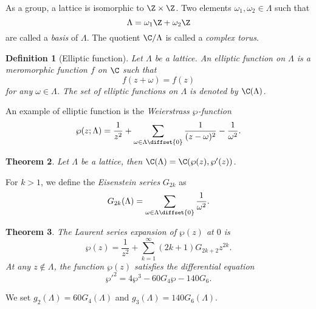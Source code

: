 \documentclass{article}
\newtheorem{theorem}{Theorem}
\newtheorem{definition}[theorem]{Definition}
\begin{document}
As a group, a lattice is isomorphic to $\Z\times\Z$. Two elements
$\omega_1,\omega_2\in\Lambda$ such that
\begin{equation}
  \label{eq:135}
  \Lambda = \omega_1\Z + \omega_2\Z
\end{equation}
are called a \emph{basis} of $\Lambda$. The quotient $\C/\Lambda$ is
called a \emph{complex torus}.

\begin{definition}[Elliptic function]
  Let $\Lambda$ be a lattice. An \emph{elliptic function} on $\Lambda$
  is a meromorphic function $f$ on $\C$ such that
  \begin{equation}
    \label{eq:141}
    f(z+\omega) = f(z)
  \end{equation}
  for any $\omega\in\Lambda$.  The set of elliptic functions on
  $\Lambda$ is denoted by $\C(\Lambda)$.
\end{definition}

An example of elliptic function is the \emph{Weierstrass
  $\wp$-function}
\begin{equation}
  \label{eq:142}
  \wp(z;\Lambda) = \frac{1}{z^2} + \sum_{\omega\in\Lambda\diffset\{0\}}\frac{1}{(z-\omega)^2}-\frac{1}{\omega^2}
  \text{.}
\end{equation}
\begin{theorem}
  Let $\Lambda$ be a lattice, then $\C(\Lambda) = \C(\wp(z),\wp'(z))$.
\end{theorem}

For $k>1$, we define the \emph{Eisenstein series} $G_{2k}$ as
\begin{equation}
  \label{eq:143}
  G_{2k}(\Lambda) = \sum_{\omega\in\Lambda\diffset\{0\}}\frac{1}{\omega^2}
  \text{.}
\end{equation}

\begin{theorem}
  The Laurent series expansion of $\wp(z)$ at $0$ is
  \begin{equation}
    \label{eq:144}
    \wp(z) = \frac{1}{z^2} + \sum_{k=1}^\infty (2k+1)G_{2k+2}z^{2k}
    \text{.}
  \end{equation}
  At any $z\not\in\Lambda$, the function $\wp(z)$ satisfies the
  differential equation
  \begin{equation}
    \label{eq:145}
    {\wp'}^2 = 4\wp^3 - 60G_4\wp - 140G_6
    \text{.}
  \end{equation}
\end{theorem}

We set $g_2(\Lambda)=60G_4(\Lambda)$ and $g_3(\Lambda)=140G_6(\Lambda)$.
\end{document}
